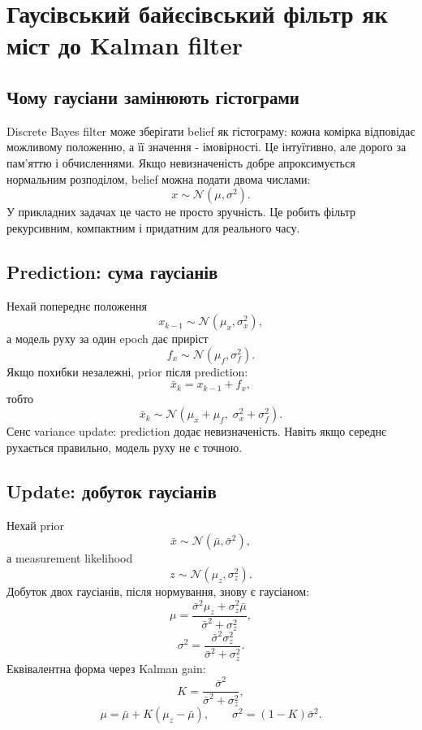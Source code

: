 \chapter{Гаусівський байєсівський фільтр як міст до Kalman filter}
\label{ch:gaussian-bayesian-kalman-bridge}


\section{Чому гаусіани замінюють гістограми}

Discrete Bayes filter може зберігати belief як гістограму: кожна комірка відповідає можливому положенню, а її значення - імовірності. Це інтуїтивно, але дорого за пам'яттю і обчисленнями. Якщо невизначеність добре апроксимується нормальним розподілом, belief можна подати двома числами:
\[
  x \sim \mathcal N(\mu,\sigma^2).
\]
У прикладних задачах це часто не просто зручність. Це робить фільтр рекурсивним, компактним і придатним для реального часу.

\section{Prediction: сума гаусіанів}

Нехай попереднє положення
\[
  x_{k-1}\sim\mathcal N(\mu_x,\sigma_x^2),
\]
а модель руху за один epoch дає приріст
\[
  f_x\sim\mathcal N(\mu_f,\sigma_f^2).
\]
Якщо похибки незалежні, prior після prediction:
\[
  \bar x_k = x_{k-1}+f_x,
\]
тобто
\[
  \bar x_k\sim\mathcal N(\mu_x+\mu_f,\;\sigma_x^2+\sigma_f^2).
\]
Сенс variance update: prediction додає невизначеність. Навіть якщо середнє рухається правильно, модель руху не є точною.

\section{Update: добуток гаусіанів}

Нехай prior
\[
  \bar x\sim\mathcal N(\bar\mu,\bar\sigma^2),
\]
а measurement likelihood
\[
  z\sim\mathcal N(\mu_z,\sigma_z^2).
\]
Добуток двох гаусіанів, після нормування, знову є гаусіаном:
\[
  \mu = \frac{\bar\sigma^2\mu_z+\sigma_z^2\bar\mu}{\bar\sigma^2+\sigma_z^2},
\]
\[
  \sigma^2 = \frac{\bar\sigma^2\sigma_z^2}{\bar\sigma^2+\sigma_z^2}.
\]
Еквівалентна форма через Kalman gain:
\[
  K = \frac{\bar\sigma^2}{\bar\sigma^2+\sigma_z^2},
\]
\[
  \mu = \bar\mu + K(\mu_z-\bar\mu),\qquad
  \sigma^2=(1-K)\bar\sigma^2.
\]

